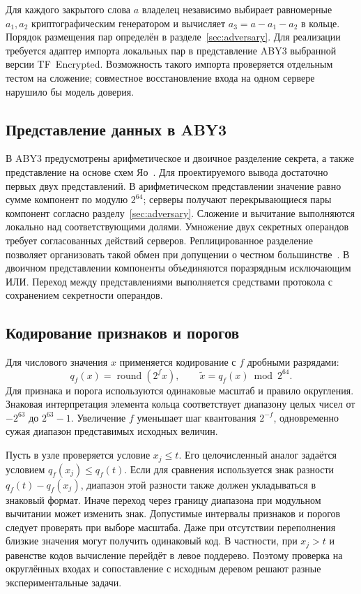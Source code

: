 Для каждого закрытого слова $a$ владелец независимо выбирает равномерные $a_1,a_2$ криптографическим генератором и вычисляет $a_3=a-a_1-a_2$ в кольце. Порядок размещения пар определён в разделе~\ref{sec:adversary}. Для реализации требуется адаптер импорта локальных пар в представление ABY3 выбранной версии TF~Encrypted. Возможность такого импорта проверяется отдельным тестом на сложение; совместное восстановление входа на одном сервере нарушило бы модель доверия.

\subsection{Представление данных в ABY3}

В ABY3 предусмотрены арифметическое и двоичное разделение секрета, а также
представление на основе схем Яо~\cite{mohassel2018aby3}. Для проектируемого
вывода достаточно первых двух представлений. В арифметическом представлении
значение равно сумме компонент по модулю $2^{64}$; серверы получают
перекрывающиеся пары компонент согласно разделу~\ref{sec:adversary}.
Сложение и вычитание выполняются локально над соответствующими долями.
Умножение двух секретных операндов требует согласованных действий серверов.
Реплицированное разделение позволяет организовать такой обмен при допущении
о честном большинстве~\cite{araki2016}. В двоичном представлении компоненты
объединяются поразрядным исключающим ИЛИ. Переход между представлениями
выполняется средствами протокола с сохранением секретности операндов.

\subsection{Кодирование признаков и порогов}

Для числового значения $x$ применяется кодирование с $f$ дробными разрядами:
\begin{equation}
    \label{eq:fixed-point}
    q_f(x)=\operatorname{round}(2^f x), \qquad
    \tilde{x}=q_f(x)\bmod 2^{64}.
\end{equation}
Для признака и порога используются одинаковые масштаб и правило округления.
Знаковая интерпретация элемента кольца соответствует диапазону целых чисел
от $-2^{63}$ до $2^{63}-1$. Увеличение $f$ уменьшает шаг квантования
$2^{-f}$, одновременно сужая диапазон представимых исходных величин.

Пусть в узле проверяется условие $x_j\leq t$. Его целочисленный аналог
задаётся условием $q_f(x_j)\leq q_f(t)$. Если для сравнения используется
знак разности $q_f(t)-q_f(x_j)$, диапазон этой разности также должен
укладываться в знаковый формат. Иначе переход через границу диапазона при
модульном вычитании может изменить знак. Допустимые интервалы признаков
и порогов следует проверять при выборе масштаба. Даже при отсутствии
переполнения близкие значения могут получить одинаковый код. В частности,
при $x_j>t$ и равенстве кодов вычисление перейдёт в левое поддерево.
Поэтому проверка на округлённых входах и сопоставление с исходным деревом
решают разные экспериментальные задачи.


